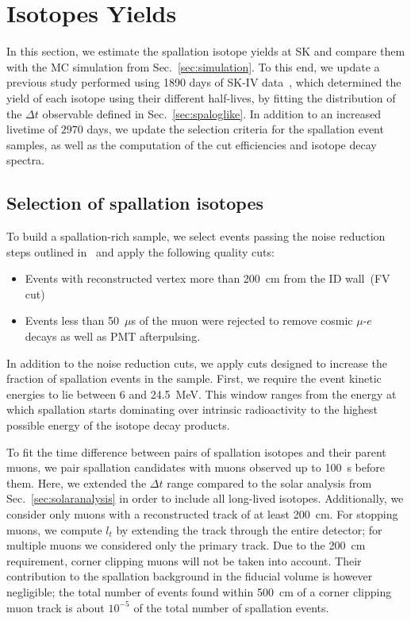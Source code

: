 \section{Isotopes Yields}
\label{sec:yields}
In this section, we estimate the spallation isotope yields at SK and compare them with the MC simulation from Sec.~\ref{sec:simulation}. To this end, we update a previous study performed using 1890 days of SK-IV data~\cite{SKspall_zhang}, which determined the yield of each isotope using their different half-lives, by fitting the distribution of the $\Delta t$ observable defined in Sec.~\ref{sec:spaloglike}. In addition to an increased livetime of $2970$ days, we update the selection criteria for the spallation event samples, as well as the computation of the cut efficiencies and isotope decay spectra.  


\subsection{Selection of spallation isotopes}
\label{sec:preselyield}
To build a spallation-rich sample, we select events passing the noise reduction steps outlined in~\cite{newsolarpaper} and apply the following quality cuts:
\begin{itemize} 
    \item Events with reconstructed vertex more than 200~cm from the ID wall~(FV cut)
    \item Events less than 50~$\mu$s of the muon were rejected to remove cosmic $\mu$-$e$ decays as well as PMT afterpulsing. 
\end{itemize}

In addition to the noise reduction cuts, we apply cuts designed to increase the fraction of spallation events in the sample. First, we require the event kinetic energies to lie between 6 and 24.5~MeV. This window ranges from the energy at which spallation starts dominating over intrinsic radioactivity to the highest possible energy of the isotope decay products. 


To fit the time difference between pairs of spallation isotopes and their parent muons, we pair spallation candidates with muons observed up to 100~s before them. Here, we extended the $\Delta t$ range compared to the solar analysis from Sec.~\ref{sec:solaranalysis} in order to include all long-lived isotopes. Additionally, we consider only muons with a reconstructed track of at least 200~cm. For stopping muons, we compute $l_t$ by extending the track through the entire detector; for multiple muons we considered only the primary track. Due to the 200~cm requirement, corner clipping muons will not be taken into account. Their contribution to the spallation background in the fiducial volume is however negligible; the total number of events found within 500~cm of a corner clipping muon track is about $10^{-5}$ of the total number of spallation events.

